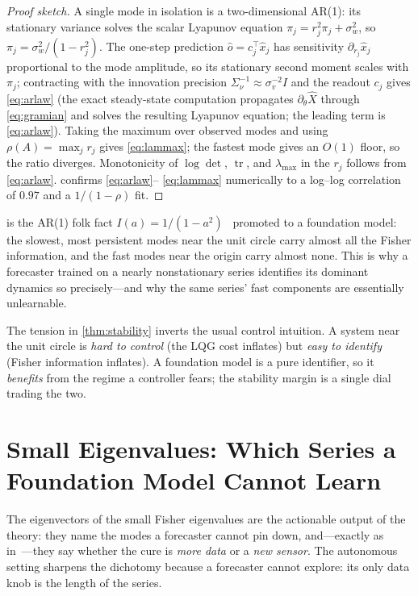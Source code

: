 \documentclass[10pt]{article}
\theoremstyle{plain}
\theoremstyle{definition}
\theoremstyle{remark}
\DeclareMathOperator{\tr}{tr}
\begin{document}
\begin{proof}[Proof sketch]
A single mode in isolation is a two-dimensional AR(1): its stationary variance
solves the scalar Lyapunov equation $\pi_j=r_j^2\pi_j+\sigma_w^2$, so
$\pi_j=\sigma_w^2/(1-r_j^2)$. The one-step prediction $\hat o=c_j^\top\hat x_j$
has sensitivity $\partial_{r_j}\hat x_j$ proportional to the mode amplitude, so
its stationary second moment scales with $\pi_j$; contracting with the
innovation precision $\Sigma_\nu^{-1}\!\approx\!\sigma_v^{-2}I$ and the readout
$c_j$ gives \eqref{eq:arlaw} (the exact steady-state computation propagates
$\partial_\theta\hat X$ through \eqref{eq:gramian} and solves the resulting
Lyapunov equation; the leading term is \eqref{eq:arlaw}). Taking the maximum over
observed modes and using $\rho(A)=\max_j r_j$ gives \eqref{eq:lammax}; the
fastest mode gives an $O(1)$ floor, so the ratio diverges. Monotonicity of
$\log\det$, $\tr$, and $\lambda_{\max}$ in the $r_j$ follows from
\eqref{eq:arlaw}.  confirms \eqref{eq:arlaw}--%
\eqref{eq:lammax} numerically to a log--log correlation of $0.97$ and a
$1/(1-\rho)$ fit.
\end{proof}

 is the AR(1) folk fact $I(a)=1/(1-a^2)$~\cite{phillips1987}
promoted to a foundation model: the slowest, most persistent modes near the unit
circle carry almost all the Fisher information, and the fast modes near the
origin carry almost none. This is why a forecaster trained on a nearly
nonstationary series identifies its dominant dynamics so precisely---and why the
same series' fast components are essentially unlearnable.

\begin{remark}
The tension in \cref{thm:stability} inverts the usual control intuition. A system
near the unit circle is \emph{hard to control} (the LQG cost inflates) but
\emph{easy to identify} (Fisher information inflates). A foundation model is a
pure identifier, so it \emph{benefits} from the regime a controller fears; the
stability margin is a single dial trading the two.
\end{remark}

\section{Small Eigenvalues: Which Series a Foundation Model Cannot Learn}
\label{sec:dichotomy}

The eigenvectors of the small Fisher eigenvalues are the actionable output of the
theory: they name the modes a forecaster cannot pin down, and---exactly as
in~\cite[\S11]{wamvla}---they say whether the cure is \emph{more data} or a
\emph{new sensor}. The autonomous setting sharpens the dichotomy because a
forecaster cannot explore: its only data knob is the length of the series.
\end{document}
